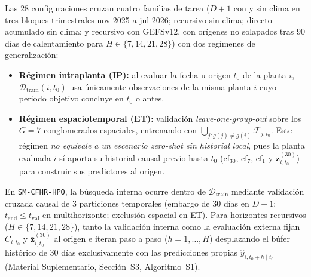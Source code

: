 Las $28$ configuraciones cruzan cuatro familias de tarea ($D+1$ con y sin clima en tres bloques trimestrales nov-2025 a jul-2026; recursivo sin clima; directo acumulado sin clima; y recursivo con GEFSv12, con orígenes no solapados tras $90$ días de calentamiento para $H \in \{7,14,21,28\}$) con dos regímenes de generalización:
\begin{itemize}
    \item \textbf{Régimen intraplanta (IP):} al evaluar la fecha u origen $t_0$ de la planta $i$, $\mathcal{D}_{\mathrm{train}}(i,t_0)$ usa únicamente observaciones de la misma planta $i$ cuyo periodo objetivo concluye en $t_0$ o antes.
    \item \textbf{Régimen espaciotemporal (ET):} validación \textit{leave-one-group-out} sobre los $G=7$ conglomerados espaciales, entrenando con $\bigcup_{j : g(j) \ne g(i)} \mathcal{F}_{j,t_0}$. Este régimen \emph{no equivale a un escenario \textit{zero-shot} sin historial local}, pues la planta evaluada $i$ sí aporta su historial causal previo hasta $t_0$ ($\mathrm{cf}_{30}$, $\mathrm{cf}_7$, $\mathrm{cf}_1$ y $\bar{\mathbf{z}}^{(30)}_{i,t_0}$) para construir sus predictores al origen.
\end{itemize}

En \texttt{SM-CFHR-HPO}, la búsqueda interna ocurre dentro de $\mathcal{D}_{\mathrm{train}}$ mediante validación cruzada causal de $3$ particiones temporales (embargo de $30$ días en $D+1$; $t_{\mathrm{end}} \le t_{\mathrm{val}}$ en multihorizonte; exclusión espacial en ET). Para horizontes recursivos ($H \in \{7,14,21,28\}$), tanto la validación interna como la evaluación externa fijan $C_{i,t_0}$ y $\bar{\mathbf{z}}^{(30)}_{i,t_0}$ al origen e iteran paso a paso ($h=1,\dots,H$) desplazando el búfer histórico de $30$ días exclusivamente con las predicciones propias $\hat{y}_{i,t_0+h \mid t_0}$ (Material Suplementario, Sección~S3, Algoritmo~S1).
